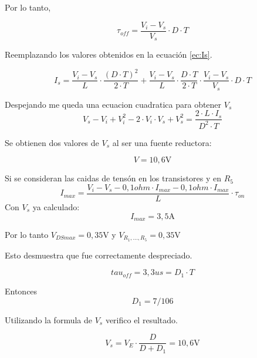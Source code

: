 Por lo tanto,

\begin{equation}
 	\si{\tau}_{off}  = \frac{{V_{i} - V_{s}}}{V_s} \cdot D \cdot T 
\end{equation}

Reemplazando los valores obtenidos en la ecuación \eqref{ec:Is}.

\begin{equation}
 	I_s = \frac{{V_{i} - V_{s}}}{L} \cdot \frac{(D \cdot T)^2 }{2 \cdot T} + \frac{{V_{i} - V_{s}}}{L} \cdot \frac{D \cdot T }{2 \cdot T} \cdot \frac{{V_{i} - V_{s}}}{V_s} \cdot D \cdot T
\end{equation}

Despejando me queda una ecuacion cuadratica para obtener $V_s$
\begin{equation}
	V_s - V_i + V^2_i -2 \cdot V_i \cdot V_s + V^2_s =  \frac{2 \cdot L \cdot I_s}{D^2 \cdot T}
\end{equation}

Se obtienen dos valores de $V_s$ al ser una fuente reductora:

\begin{equation}
 	V = 10,6\si{\volt} 
\end{equation}

Si se consideran las caidas de tensón en los transistores y en $R_5$
\begin{equation}
	I_{max} = \frac{V_i - V_s - 0,1 \si{ohm} \cdot I_{max} - 0,1 \si{ohm} \cdot I_{max} }{L} \cdot \si{\tau}_{on}
\end{equation}
Con $V_s$ ya calculado:
\begin{equation}
	I_{max} = 3,5 \si{\ampere}
\end{equation}

Por lo tanto $V_{DSmax} = 0,35 \si{\volt}$ y $V_{R_1,...,R_5} = 0,35 \si{\volt}$

Esto desmuestra que fue correctamente despreciado.


\begin{equation}
	tau_{off} = 3,3 us = D_1 \cdot T
\end{equation}

Entonces
\begin{equation}
 	D_1  = 7/ 106 
\end{equation}

Utilizando la formula de $V_s$ verifico el resultado.

\begin{equation}
 	V_s  = V_E \cdot \frac{D}{D + D_1} = 10,6\si{\volt}
\end{equation}
